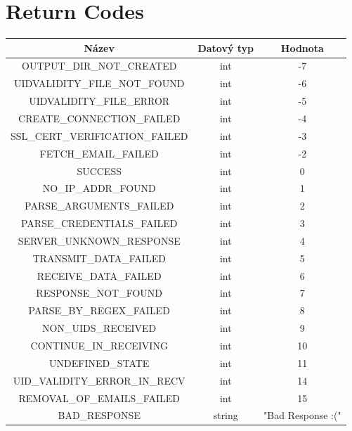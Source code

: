 \documentclass[a4paper,11pt]{article}
\begin{document}
\section{Return Codes}
\begin{center}
    \vspace{0.5cm} %
    \begin{tabular}{|c|c|c|}
        \hline
        \textbf{Název} & \textbf{Datový typ} & \textbf{Hodnota} \\
        \hline
        OUTPUT\_DIR\_NOT\_CREATED & int & -7 \\
        \hline
        UIDVALIDITY\_FILE\_NOT\_FOUND & int & -6 \\
        \hline
        UIDVALIDITY\_FILE\_ERROR & int & -5 \\
        \hline
        CREATE\_CONNECTION\_FAILED & int & -4 \\
        \hline
        SSL\_CERT\_VERIFICATION\_FAILED & int & -3 \\
        \hline
        FETCH\_EMAIL\_FAILED & int & -2 \\
        \hline
        SUCCESS & int & 0 \\
        \hline
        NO\_IP\_ADDR\_FOUND & int & 1 \\
        \hline
        PARSE\_ARGUMENTS\_FAILED & int & 2 \\
        \hline
        PARSE\_CREDENTIALS\_FAILED & int & 3 \\
        \hline
        SERVER\_UNKNOWN\_RESPONSE & int & 4 \\
        \hline
        TRANSMIT\_DATA\_FAILED & int & 5 \\
        \hline
        RECEIVE\_DATA\_FAILED & int & 6 \\
        \hline
        RESPONSE\_NOT\_FOUND & int & 7 \\
        \hline
        PARSE\_BY\_REGEX\_FAILED & int & 8 \\
        \hline
        NON\_UIDS\_RECEIVED & int & 9 \\
        \hline
        CONTINUE\_IN\_RECEIVING & int & 10 \\
        \hline
        UNDEFINED\_STATE & int & 11 \\
        \hline
        UID\_VALIDITY\_ERROR\_IN\_RECV & int & 14 \\
        \hline
        REMOVAL\_OF\_EMAILS\_FAILED & int & 15 \\
        \hline
        BAD\_RESPONSE & string & "Bad Response :(" \\
        \hline
    \end{tabular}
    \vspace{0.5cm} %
\end{center}



      
\end{document}
